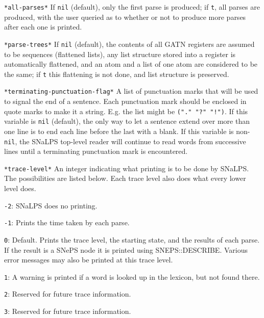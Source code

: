 \documentclass{book}
\begin{document}
\begin{description}
\item{\verb|*all-parses*|} If {\tt nil} (default), only the first
parse is produced; if {\tt t}, all parses are produced, with the user
queried as to whether or not to produce more parses after each one is
printed.

\item{\verb|*parse-trees*|} If {\tt nil} (default), the contents of all GATN registers are assumed
to be sequences (flattened lists), any list structure stored into a register is automatically
flattened, and an atom and a list of one atom are considered to be the same; if {\tt t} this
flattening is not done, and list structure is preserved.

\item{\verb|*terminating-punctuation-flag*|} A list of punctuation marks that will be used
to signal the end of a sentence.  Each punctuation mark should be enclosed in quote marks to make it
a string.  E.g.  the list might be {\tt ("." "?" "!")}.  If this variable is {\tt nil} (default),
the only way to let a sentence extend over more than one line is to end each line before the last
with a blank.  If this variable is non-{\tt nil}, the SNaLPS top-level reader will continue to read
words from successive lines until a terminating punctuation mark is encountered.

\item{\verb|*trace-level*|} An integer indicating what printing is to be done by SNaLPS.  The
possibilities are listed below.  Each trace level also does what every lower level does.
\begin{description}
\item{\verb|-2|:} SNaLPS does no printing.
\item{\verb|-1|:} Prints the time taken by each parse.

\item{\verb|0|:} Default.  Prints the trace level, the starting state, and the results of each parse.  If the
result is a SNePS node it is printed using SNEPS::DESCRIBE.  Various error messages may also be printed at
this trace level.

\item{\verb|1|:} A warning is printed if a word is looked up in the lexicon, but not found there.

\item{\verb|2|:} Reserved for future trace information.

\item{\verb|3|:} Reserved for future trace information.


\end{description}
\end{description}
\end{document}
